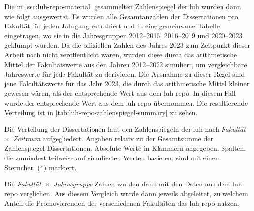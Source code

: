 Die in \cref{sec:luh-repo-material} gesammelten Zahlenspiegel der \gls{luh} wurden dann wie folgt ausgewertet.
Es wurden alle Gesamtanzahlen der Dissertationen pro Fakultät für jeden Jahrgang extrahiert und in eine gemeinsame Tabelle eingetragen, wo sie in die Jahresgruppen 2012--2015, 2016--2019 und 2020--2023 geklumpt wurden.
Da die offiziellen Zahlen des Jahres 2023 zum Zeitpunkt dieser Arbeit noch nicht veröffentlicht waren, wurden diese durch das arithmetische Mittel der Fakultätswerte aus den Jahren 2012--2022 simuliert, um vergleichbare Jahreswerte für jede Fakultät zu derivieren.
Die Ausnahme zu dieser Regel sind jene Fakultätswerte für das Jahr 2023, die durch das arithmetische Mittel kleiner gewesen wären, als der entsprechende Wert aus dem \gls{luh-repo}.
In diesem Fall wurde der entsprechende Wert aus dem \gls{luh-repo} übernommen.
Die resultierende Verteilung ist in \cref{tab:luh-repo-zahlenspiegel-summary} zu sehen.
\begin{table}[!htbp]
	\caption{Die Verteilung der Dissertationen laut den Zahlenspiegeln der \gls{luh} nach \textit{Fakultät}~$\times$~\textit{Zeitraum} aufgegliedert.
    Angaben relativ zu der Gesamtsumme der Zahlenspiegel-Dissertationen.
    Absolute Werte in Klammern angegeben.
    Spalten, die zumindest teilweise auf simulierten Werten basieren, sind mit einem Sternchen~(*) markiert.}
    
	\label{tab:luh-repo-zahlenspiegel-summary}
\end{table}
Die \textit{Fakultät}~$\times$~\textit{Jahresgruppe}-Zahlen wurden dann mit den Daten aus dem \gls{luh-repo} verglichen.
Aus diesem Vergleich wurde dann jeweils abgeleitet, zu welchem Anteil die Promovierenden der verschiedenen Fakultäten das \gls{luh-repo} nutzen.

